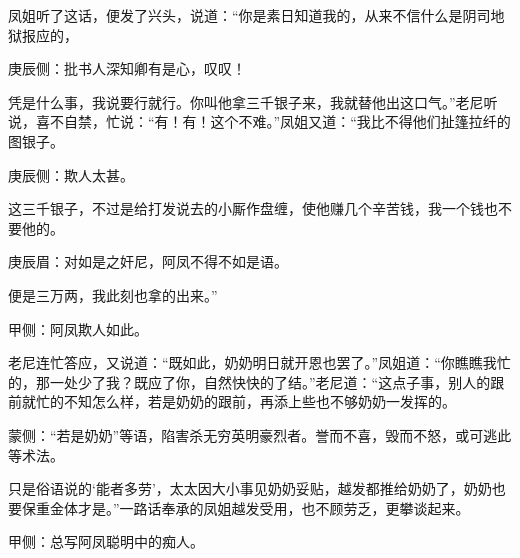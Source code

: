 \begin{parag}
    凤姐听了这话，便发了兴头，说道：“你是素日知道我的，从来不信什么是阴司地狱报应的，\begin{note}庚辰侧：批书人深知卿有是心，叹叹！\end{note}凭是什么事，我说要行就行。你叫他拿三千银子来，我就替他出这口气。”老尼听说，喜不自禁，忙说：“有！有！这个不难。”凤姐又道：“我比不得他们扯篷拉纤的图银子。\begin{note}庚辰侧：欺人太甚。\end{note}这三千银子，不过是给打发说去的小厮作盘缠，使他赚几个辛苦钱，我一个钱也不要他的。\begin{note}庚辰眉：对如是之奸尼，阿凤不得不如是语。\end{note}便是三万两，我此刻也拿的出来。”\begin{note}甲侧：阿凤欺人如此。\end{note}老尼连忙答应，又说道：“既如此，奶奶明日就开恩也罢了。”凤姐道：“你瞧瞧我忙的，那一处少了我？既应了你，自然快快的了结。”老尼道：“这点子事，别人的跟前就忙的不知怎么样，若是奶奶的跟前，再添上些也不够奶奶一发挥的。\begin{note}蒙侧：“若是奶奶”等语，陷害杀无穷英明豪烈者。誉而不喜，毁而不怒，或可逃此等术法。\end{note}只是俗语说的‘能者多劳’，太太因大小事见奶奶妥贴，越发都推给奶奶了，奶奶也要保重金体才是。”一路话奉承的凤姐越发受用，也不顾劳乏，更攀谈起来。\begin{note}甲侧：总写阿凤聪明中的痴人。\end{note}
\end{parag}



